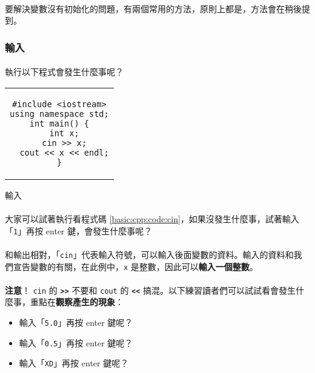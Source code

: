 \documentclass[12pt,a4paper,oneside]{article}
\begin{document}
\begin{CJK}{UTF8}{bkai}
\paragraph{}要解決變數沒有初始化的問題，有兩個常用的方法，原則上都是，方法會在稍後提到。

\subsubsection{輸入}

\paragraph{}執行以下程式會發生什麼事呢？

\begin{code}[h!]
\centering
\begin{tabular}{c}
\begin{lstlisting}
#include <iostream>
using namespace std;
int main() {
  int x;
  cin >> x;
  cout << x << endl;
}
\end{lstlisting}
\end{tabular}
\caption{輸入}
\label{basic:cpp:code:cin}
\end{code}

\paragraph{}大家可以試著執行看程式碼 \ref{basic:cpp:code:cin}，如果沒發生什麼事，試著輸入「\lstinline!1!」再按 enter 鍵，會發生什麼事呢？
\paragraph{}和輸出相對，「\lstinline!cin!」代表輸入符號，可以輸入後面變數的資料。輸入的資料和我們宣告變數的有關，在此例中，\lstinline!x! 是整數，因此可以\textbf{輸入一個整數}。
\paragraph{}\textbf{注意}！ \lstinline!cin! 的 \textbf{\lstinline!>>!} 不要和 \lstinline!cout! 的 \textbf{\lstinline!<<!} 搞混。以下練習讀者們可以試試看會發生什麼事，重點在\textbf{觀察產生的現象}：

\begin{itemize}
\item 輸入「\texttt{5.0}」再按 enter 鍵呢？
\item 輸入「\texttt{0.5}」再按 enter 鍵呢？
\item 輸入「\texttt{XD}」再按 enter 鍵呢？
\end{itemize}


\end{CJK}
\end{document}
